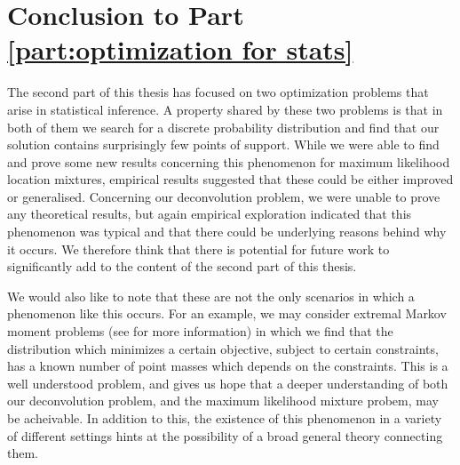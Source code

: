 \chapter{Conclusion to Part \ref{part:optimization for stats}}
\label{Ch:StatisticalOptimizationConclusion}


\graphicspath{{Figures/Mixtures/}}


The second part of this thesis has focused on two optimization problems that arise in statistical inference. A property shared by these two problems is that in both of them we search for a discrete probability distribution and find that our solution contains surprisingly few points of support. While we were able to find and prove some new results concerning this phenomenon for maximum likelihood location mixtures, empirical results suggested that these could be either improved or generalised. Concerning our deconvolution problem, we were unable to prove any theoretical results, but again empirical exploration indicated that this phenomenon was typical and that there could be underlying reasons behind why it occurs. We therefore think that there is potential for future work to significantly add to the content of the second part of this thesis. 

We would also like to note that these are not the only scenarios in which a phenomenon like this occurs. For an example, we may consider extremal Markov moment problems (see \cite{Krein1977-ak} for more information) in which we find that the distribution which minimizes a certain objective, subject to certain constraints, has a known number of point masses which depends on the constraints. This is a well understood problem, and gives us hope that a deeper understanding of both our deconvolution problem, and the maximum likelihood mixture probem, may be acheivable. In addition to this, the existence of this phenomenon in a variety of different settings hints at the possibility of a broad general theory connecting them.


